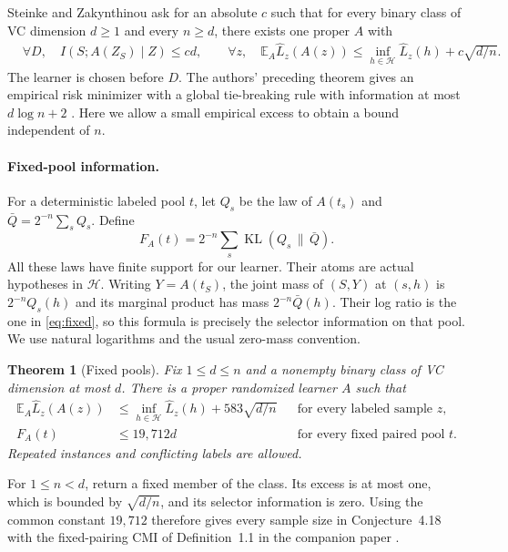 \documentclass[11pt]{article}
\newtheorem{theorem}{Theorem}[section]
\theoremstyle{definition}\newtheorem{definition}[theorem]{Definition}
\newcommand{\E}{\mathbb E}
\newcommand{\HH}{\mathcal H}
\newcommand{\KL}{\operatorname{KL}}
\newcommand{\err}{\widehat L}
\begin{document}
Steinke and Zakynthinou \cite[Conjecture 6]{problem} ask for an absolute $c$ such that for every binary class
of VC dimension $d\ge1$ and every $n\ge d$, there exists one proper $A$ with
\begin{align}
  &\forall D,\quad I(S;A(Z_S)\mid Z)\le cd, \qquad
    \forall z,\quad \E_A\err_z(A(z))
       \le \inf_{h\in\HH}\err_z(h)+c\sqrt{d/n}.
       \label{eq:conj}
\end{align}
The learner is chosen before $D$. The authors' preceding theorem gives an
empirical risk minimizer with a global tie-breaking rule with information at most
$d\log n+2$ \cite[Theorem 5]{problem}. Here we allow a small empirical excess
to obtain a bound independent of $n$.

\paragraph{Fixed-pool information.}
For a deterministic labeled pool $t$, let $Q_s$ be the law of $A(t_s)$
and $\bar Q=2^{-n}\sum_s Q_s$. Define
\begin{equation}
  F_A(t)=2^{-n}\sum_s\KL(Q_s\,\|\,\bar Q).
  \label{eq:fixed}
\end{equation}
All these laws have finite support for our learner. Their atoms are actual
hypotheses in $\HH$. Writing $Y=A(t_S)$, the joint mass of $(S,Y)$ at $(s,h)$ is
$2^{-n}Q_s(h)$ and its marginal product has mass $2^{-n}\bar Q(h)$.
Their log ratio is the one in \eqref{eq:fixed}, so this formula is precisely
the selector information on that pool. We use natural logarithms and the
usual zero-mass convention.

\begin{theorem}[Fixed pools]\label{thm:pool}
Fix $1\le d\le n$ and a nonempty binary class of VC dimension at most $d$.
There is a proper randomized learner $A$ such that
\begin{align}
 \E_A\err_z(A(z))&\le\inf_{h\in\HH}\err_z(h)+583\sqrt{d/n}
                      &&\text{for every labeled sample }z, \label{eq:accuracy}\\
 F_A(t)&\le19{,}712d
                      &&\text{for every fixed paired pool }t. \label{eq:pool}
\end{align}
Repeated instances and conflicting labels are allowed.
\end{theorem}

For $1\le n<d$, return a fixed member of the class. Its excess is at
most one, which is bounded by $\sqrt{d/n}$, and its selector information
is zero. Using the common constant $19{,}712$ therefore gives every sample
size in Conjecture~4.18 with the fixed-pairing CMI of Definition~1.1 in
the companion paper \cite{framework}.
\end{document}
